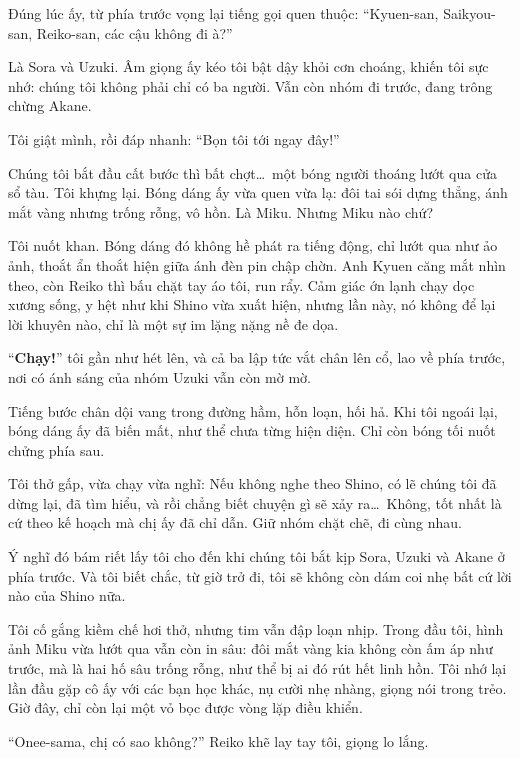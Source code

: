 \documentclass[../main.tex]{subfiles}
\begin{document}
Đúng lúc ấy, từ phía trước vọng lại tiếng gọi quen thuộc: ``Kyuen-san, Saikyou-san, Reiko-san, các cậu không đi à?''

Là Sora và Uzuki. Âm giọng ấy kéo tôi bật dậy khỏi cơn choáng, khiến tôi sực nhớ: chúng tôi không phải chỉ có ba người. Vẫn còn nhóm đi trước, đang trông chừng Akane.

Tôi giật mình, rồi đáp nhanh: ``Bọn tôi tới ngay đây!''

Chúng tôi bắt đầu cất bước thì bất chợt\dots\ một bóng người thoáng lướt qua cửa sổ tàu. Tôi khựng lại. Bóng dáng ấy vừa quen vừa lạ: đôi tai sói dựng thẳng, ánh mắt vàng nhưng trống rỗng, vô hồn. Là Miku. Nhưng Miku nào chứ?


Tôi nuốt khan. Bóng dáng đó không hề phát ra tiếng động, chỉ lướt qua như ảo ảnh, thoắt ẩn thoắt hiện giữa ánh đèn pin chập chờn. Anh Kyuen căng mắt nhìn theo, còn Reiko thì bấu chặt tay áo tôi, run rẩy. Cảm giác ớn lạnh chạy dọc xương sống, y hệt như khi Shino vừa xuất hiện, nhưng lần này, nó không để lại lời khuyên nào, chỉ là một sự im lặng nặng nề đe dọa.

``\textbf{Chạy!}'' tôi gần như hét lên, và cả ba lập tức vắt chân lên cổ, lao về phía trước, nơi có ánh sáng của nhóm Uzuki vẫn còn mờ mờ.

Tiếng bước chân dội vang trong đường hầm, hỗn loạn, hối hả. Khi tôi ngoái lại, bóng dáng ấy đã biến mất, như thể chưa từng hiện diện. Chỉ còn bóng tối nuốt chửng phía sau.

Tôi thở gấp, vừa chạy vừa nghĩ: Nếu không nghe theo Shino, có lẽ chúng tôi đã dừng lại, đã tìm hiểu, và rồi chẳng biết chuyện gì sẽ xảy ra\dots\ Không, tốt nhất là cứ theo kế hoạch mà chị ấy đã chỉ dẫn. Giữ nhóm chặt chẽ, đi cùng nhau.

Ý nghĩ đó bám riết lấy tôi cho đến khi chúng tôi bắt kịp Sora, Uzuki và Akane ở phía trước. Và tôi biết chắc, từ giờ trở đi, tôi sẽ không còn dám coi nhẹ bất cứ lời nào của Shino nữa.

Tôi cố gắng kiềm chế hơi thở, nhưng tim vẫn đập loạn nhịp. Trong đầu tôi, hình ảnh Miku vừa lướt qua vẫn còn in sâu: đôi mắt vàng kia không còn ấm áp như trước, mà là hai hố sâu trống rỗng, như thể bị ai đó rút hết linh hồn. Tôi nhớ lại lần đầu gặp cô ấy với các bạn học khác, nụ cười nhẹ nhàng, giọng nói trong trẻo. Giờ đây, chỉ còn lại một vỏ bọc được vòng lặp điều khiển.

``Onee-sama, chị có sao không?'' Reiko khẽ lay tay tôi, giọng lo lắng.
\end{document}
